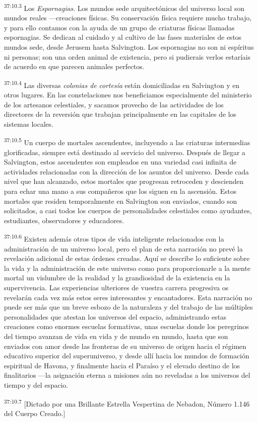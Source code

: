 \par
\textsuperscript{37:10.3} Los \textit{Espornagias}. Los mundos sede arquitectónicos del universo local son mundos reales ---creaciones físicas. Su conservación física requiere mucho trabajo, y para ello contamos con la ayuda de un grupo de criaturas físicas llamadas espornagias. Se dedican al cuidado y al cultivo de las fases materiales de estos mundos sede, desde Jerusem hasta Salvington. Los espornagias no son ni espíritus ni personas; son una orden animal de existencia, pero si pudierais verlos estaríais de acuerdo en que parecen animales perfectos.

\par
\textsuperscript{37:10.4} Las diversas \textit{colonias de cortesía} están domiciliadas en Salvington y en otros lugares. En las constelaciones nos beneficiamos especialmente del ministerio de los artesanos celestiales, y sacamos provecho de las actividades de los directores de la reversión que trabajan principalmente en las capitales de los sistemas locales.

\par
\textsuperscript{37:10.5} Un cuerpo de mortales ascendentes, incluyendo a las criaturas intermedias glorificadas, siempre está destinado al servicio del universo. Después de llegar a Salvington, estos ascendentes son empleados en una variedad casi infinita de actividades relacionadas con la dirección de los asuntos del universo. Desde cada nivel que han alcanzado, estos mortales que progresan retroceden y descienden para echar una mano a sus compañeros que los siguen en la ascensión. Estos mortales que residen temporalmente en Salvington son enviados, cuando son solicitados, a casi todos los cuerpos de personalidades celestiales como ayudantes, estudiantes, observadores y educadores.

\par
\textsuperscript{37:10.6} Existen además otros tipos de vida inteligente relacionados con la administración de un universo local, pero el plan de esta narración no prevé la revelación adicional de estas órdenes creadas. Aquí se describe lo suficiente sobre la vida y la administración de este universo como para proporcionarle a la mente mortal un vislumbre de la realidad y la grandiosidad de la existencia en la supervivencia. Las experiencias ulteriores de vuestra carrera progresiva os revelarán cada vez más estos seres interesantes y encantadores. Esta narración no puede ser más que un breve esbozo de la naturaleza y del trabajo de las múltiples personalidades que atestan los universos del espacio, administrando estas creaciones como enormes escuelas formativas, unas escuelas donde los peregrinos del tiempo avanzan de vida en vida y de mundo en mundo, hasta que son enviados con amor desde las fronteras de su universo de origen hacia el régimen educativo superior del superuniverso, y desde allí hacia los mundos de formación espiritual de Havona, y finalmente hacia el Paraíso y el elevado destino de los finalitarios ---la asignación eterna a misiones aún no reveladas a los universos del tiempo y del espacio.

\par
\textsuperscript{37:10.7} [Dictado por una Brillante Estrella Vespertina de Nebadon, Número 1.146 del Cuerpo Creado.]